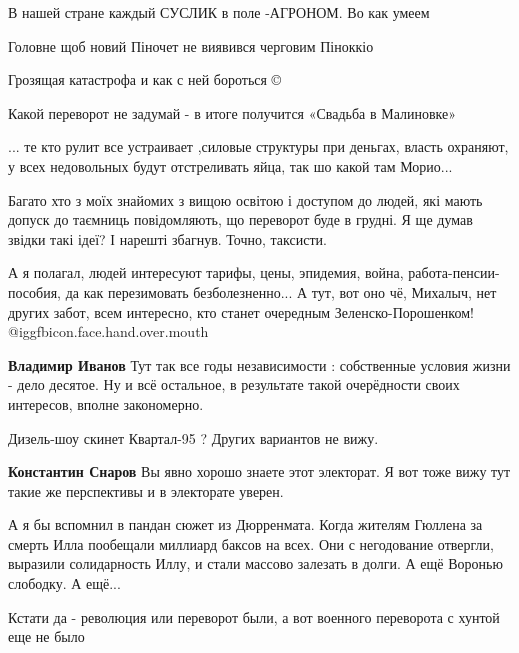 \begin{itemize}
В нашей стране каждый СУСЛИК в поле -АГРОНОМ. Во как умеем

Головне щоб новий Піночет не виявився черговим Піноккіо

Грозящая катастрофа и как с ней бороться ©

Какой переворот не задумай - в итоге получится «Свадьба в Малиновке»


... те кто рулит все устраивает ,силовые структуры при деньгах, власть
охраняют, у всех недовольных будут отстреливать яйца, так шо какой там Морио...



Багато хто з моїх знайомих з вищою освітою і доступом до людей, які мають
допуск до таємниць повідомляють, що переворот буде в грудні. Я ще думав звідки
такі ідеї? І нарешті збагнув. Точно, таксисти.


А я полагал, людей интересуют тарифы, цены, эпидемия, война,
работа-пенсии-пособия, да как перезимовать безболезненно... А тут, вот оно чё,
Михалыч, нет других забот, всем интересно, кто станет очередным
Зеленско-Порошенком! @igg{fbicon.face.hand.over.mouth} 

\begin{itemize} %
\textbf{Владимир Иванов} Тут так все годы независимости : собственные условия жизни - дело десятое. Ну и всё остальное, в результате такой очерёдности своих интересов, вполне закономерно.
\end{itemize} %

Дизель-шоу скинет Квартал-95 ? Других вариантов не вижу.

\begin{itemize} %
\textbf{Константин Снаров} Вы явно хорошо знаете этот электорат. Я вот тоже вижу тут такие же перспективы и в электорате уверен.
\end{itemize} %


А я бы вспомнил в пандан сюжет из Дюрренмата. Когда жителям Гюллена за смерть
Илла пообещали миллиард баксов на всех. Они с негодование отвергли, выразили
солидарность Иллу, и стали массово залезать в долги. А ещё Воронью слободку. А
ещё...


Кстати да - революция или переворот были, а вот военного переворота с хунтой еще не было


\end{itemize}
